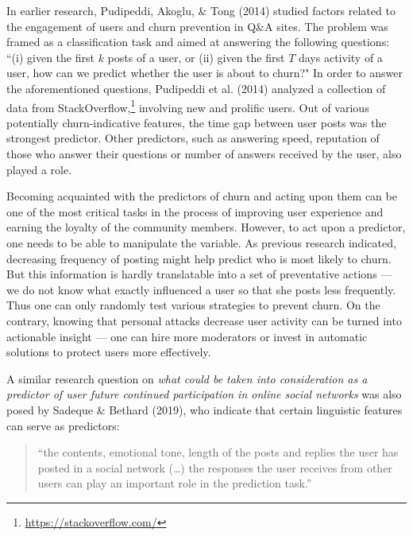 \documentclass[10pt,dvipsnames]{scrartcl}
\begin{document}
In earlier research, Pudipeddi, Akoglu, \& Tong (2014) studied factors
related to the engagement of users and churn prevention in Q\&A sites.
The problem was framed as a classification task and aimed at answering
the following questions: ``(i) given the first \(k\) posts of a user, or
(ii) given the first \(T\) days activity of a user, how can we predict
whether the user is about to churn?" In order to answer the
aforementioned questions, Pudipeddi et al. (2014) analyzed a collection
of data from StackOverflow,\footnote{\url{https://stackoverflow.com/}}
involving new and prolific users. Out of various potentially
churn-indicative features, the time gap between user posts was the
strongest predictor. Other predictors, such as answering speed,
reputation of those who answer their questions or number of answers
received by the user, also played a role.

Becoming acquainted with the predictors of churn and acting upon them
can be one of the most critical tasks in the process of improving user
experience and earning the loyalty of the community members. However, to
act upon a predictor, one needs to be able to manipulate the variable.
As previous research indicated, decreasing frequency of posting might
help predict who is most likely to churn. But this information is hardly
translatable into a set of preventative actions --- we do not know what
exactly influenced a user so that she posts less frequently. Thus one
can only randomly test various strategies to prevent churn. On the
contrary, knowing that personal attacks decrease user activity can be
turned into actionable insight --- one can hire more moderators or
invest in automatic solutions to protect users more effectively.

A similar research question on
\emph{what could be taken into consideration as a predictor of user future continued participation in online social networks}
was also posed by Sadeque \& Bethard (2019), who indicate that certain
linguistic features can serve as predictors:

\begin{quote}``the contents, emotional tone, length of the posts and replies the user has posted in a social network (\dots) the responses the user receives from other users can play an important role in the prediction task.''\end{quote}
\end{document}
